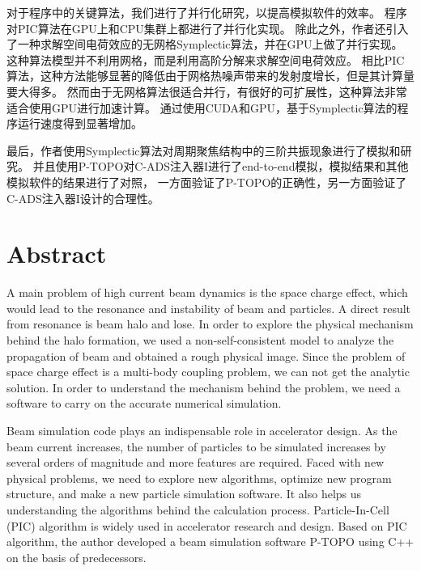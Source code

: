 对于程序中的关键算法，我们进行了并行化研究，以提高模拟软件的效率。
程序对PIC算法在GPU上和CPU集群上都进行了并行化实现。
除此之外，作者还引入了一种求解空间电荷效应的无网格Symplectic算法，并在GPU上做了并行实现。
这种算法模型并不利用网格，而是利用高阶分解来求解空间电荷效应。
相比PIC算法，这种方法能够显著的降低由于网格热噪声带来的发射度增长，但是其计算量要大得多。
然而由于无网格算法很适合并行，有很好的可扩展性，这种算法非常适合使用GPU进行加速计算。
通过使用CUDA和GPU，基于Symplectic算法的程序运行速度得到显著增加。

最后，作者使用Symplectic算法对周期聚焦结构中的三阶共振现象进行了模拟和研究。
并且使用P-TOPO对C-ADS注入器I进行了end-to-end模拟，模拟结果和其他模拟软件的结果进行了对照，
一方面验证了P-TOPO的正确性，另一方面验证了C-ADS注入器I设计的合理性。



\chapter{Abstract}%

A main problem of high current beam dynamics is the space charge effect, which would lead to the resonance and instability of beam and particles.
A direct result from resonance is beam halo and lose.
In order to explore the physical mechanism behind the halo formation, we used a non-self-consistent model to analyze the propagation of beam and obtained a rough physical image.
Since the problem of space charge effect is a multi-body coupling problem, we can not get the analytic solution.
In order to understand the mechanism behind the problem, we need a software to carry on the accurate numerical simulation.

Beam simulation code plays an indispensable role in accelerator design.
As the beam current increases, the number of particles to be simulated increases by several orders of magnitude
and more features are required.
Faced with new physical problems, we need to explore new algorithms, optimize new program structure, and make a new particle simulation software.
It also helps us understanding the algorithms behind the calculation process.
Particle-In-Cell (PIC) algorithm is widely used in accelerator research and design.
Based on PIC algorithm, the author developed a beam simulation software P-TOPO using C++ on the basis of predecessors.

